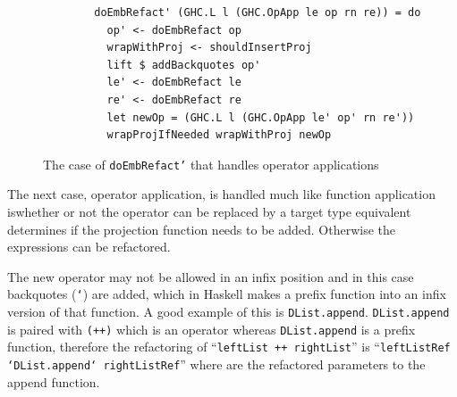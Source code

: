 \begin{figure}[t]
\begin{lstlisting}
        doEmbRefact' (GHC.L l (GHC.OpApp le op rn re)) = do
          op' <- doEmbRefact op
          wrapWithProj <- shouldInsertProj
          lift $ addBackquotes op'
          le' <- doEmbRefact le
          re' <- doEmbRefact re
          let newOp = (GHC.L l (GHC.OpApp le' op' rn re'))
          wrapProjIfNeeded wrapWithProj newOp
\end{lstlisting}
\caption{The case of \texttt{doEmbRefact'} that handles operator applications}
\label{embRefactOp}
\end{figure}

The next case, operator application, is handled much like function application is\DIFdelbegin \DIFdel{, }\DIFdelend \DIFaddbegin \DIFadd{: }\DIFaddend whether or not the operator can be replaced by a target type equivalent determines if the projection function needs to be added. Otherwise the \DIFdelbegin {}\DIFdelend \DIFaddbegin {}\DIFaddend expressions can be refactored. 

The new operator may not be allowed in an infix position and in this case backquotes (\texttt{`}) are added, which in Haskell makes a prefix function into an infix version of that function. A good example of this is \texttt{DList.append}. \texttt{DList.append} is paired with \texttt{(++)} which is an operator whereas \texttt{DList.append} is a prefix function, therefore the refactoring of ``\texttt{leftList ++ rightList}'' is ``\texttt{leftListRef `DList.append` rightListRef}'' where \DIFdelbegin {}\DIFdelend \DIFaddbegin \texttt{} \DIFaddend \texttt{\DIFdelbegin {}\DIFdelend \DIFaddbegin {}\DIFaddend } \DIFdelbegin {}\DIFdelend are the refactored parameters to the append function.

